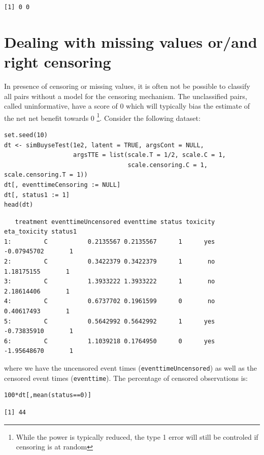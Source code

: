 \documentclass[12pt]{article}
\begin{document}
\begin{verbatim}
[1] 0 0
\end{verbatim}


\clearpage

\section{Dealing with missing values or/and right censoring}
\label{sec:org8eac464}

In presence of censoring or missing values, it is often not be
 possible to classify all pairs without a model for the censoring
 mechanism. The unclassified pairs, called uninformative, have a score
 of 0 which will typically bias the estimate of the net net benefit
 towards 0 \footnote{While the power is typically reduced, the type 1 error
 will still be controled if censoring is at random}. Consider the
 following dataset:
\lstset{language=r,label= ,caption= ,captionpos=b,numbers=none}
\begin{lstlisting}
set.seed(10)
dt <- simBuyseTest(1e2, latent = TRUE, argsCont = NULL,
                   argsTTE = list(scale.T = 1/2, scale.C = 1,
                                  scale.censoring.C = 1, scale.censoring.T = 1))
dt[, eventtimeCensoring := NULL]
dt[, status1 := 1]
head(dt)
\end{lstlisting}

\begin{verbatim}
   treatment eventtimeUncensored eventtime status toxicity eta_toxicity status1
1:         C           0.2135567 0.2135567      1      yes  -0.07945702       1
2:         C           0.3422379 0.3422379      1       no   1.18175155       1
3:         C           1.3933222 1.3933222      1       no   2.18614406       1
4:         C           0.6737702 0.1961599      0       no   0.40617493       1
5:         C           0.5642992 0.5642992      1      yes  -0.73835910       1
6:         C           1.1039218 0.1764950      0      yes  -1.95648670       1
\end{verbatim}


where we have the uncensored event times (\texttt{eventtimeUncensored}) as well as the censored event
times (\texttt{eventtime}). The percentage of censored observations is:
\lstset{language=r,label= ,caption= ,captionpos=b,numbers=none}
\begin{lstlisting}
100*dt[,mean(status==0)]
\end{lstlisting}

\begin{verbatim}
[1] 44
\end{verbatim}
\end{document}
